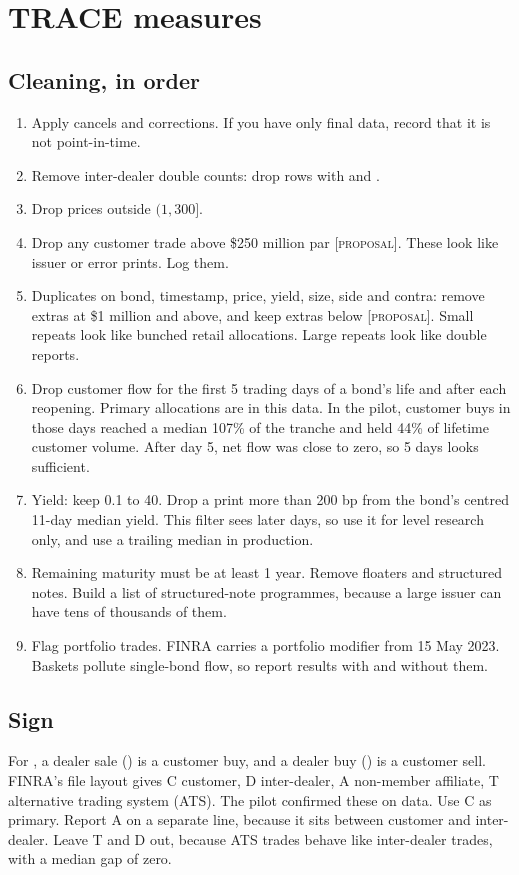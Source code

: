 \documentclass[11pt]{article}
\newcommand{\code}[1]{\texttt{\detokenize{#1}}}
\newcommand{\proposal}{\textsc{[proposal]}}
\begin{document}
\section{TRACE measures}\label{sec:trace}
\subsection{Cleaning, in order}
\begin{enumerate}
\item Apply cancels and corrections. If you have only final data, record that it is not point-in-time.
\item Remove inter-dealer double counts: drop rows with \code{contra = D} and \code{reporter_side = B}.
\item Drop prices outside $(1, 300]$.
\item Drop any customer trade above \$250 million par \proposal. These look like issuer or error prints. Log them.
\item Duplicates on bond, timestamp, price, yield, size, side and contra: remove extras at \$1 million and above, and keep extras below \proposal. Small repeats look like bunched retail allocations. Large repeats look like double reports.
\item Drop customer flow for the first 5 trading days of a bond's life and after each reopening. Primary allocations are in this data. In the pilot, customer buys in those days reached a median 107\% of the tranche and held 44\% of lifetime customer volume. After day 5, net flow was close to zero, so 5 days looks sufficient.
\item Yield: keep 0.1 to 40. Drop a print more than 200 bp from the bond's centred 11-day median yield. This filter sees later days, so use it for level research only, and use a trailing median in production.
\item Remaining maturity must be at least 1 year. Remove floaters and structured notes. Build a list of structured-note programmes, because a large issuer can have tens of thousands of them.
\item Flag portfolio trades. FINRA carries a portfolio modifier from 15 May 2023. Baskets pollute single-bond flow, so report results with and without them.
\end{enumerate}

\subsection{Sign}
For \code{contra = C}, a dealer sale (\code{S}) is a customer buy, and a dealer buy (\code{B}) is a customer sell. FINRA's file layout gives C customer, D inter-dealer, A non-member affiliate, T alternative trading system (ATS). The pilot confirmed these on data. Use C as primary. Report A on a separate line, because it sits between customer and inter-dealer. Leave T and D out, because ATS trades behave like inter-dealer trades, with a median gap of zero.
\end{document}
